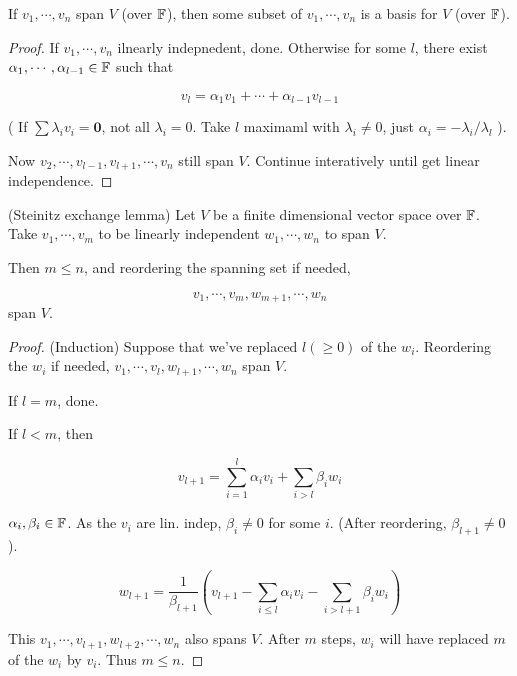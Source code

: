 \documentclass[a4paper]{article}
\begin{document}
\begin{lemma} 
	If $ v_{1},\cdots,v_{n} $ span $ V $ (over $ \mathbb{F} $), then some subset of $ v_{1},\cdots,v_{n} $ is a basis for $ V $ (over $ \mathbb{F} $).	
\end{lemma}

\begin{proof}
		If $ v_{1},\cdots,v_{n} $ ilnearly indepnedent, done.
		Otherwise for some $ l $, there exist $ \alpha_{1},\cdots,\alpha_{l-1} \in \mathbb{F} $ such that
		
		\[ v_{l} = \alpha_{1} v_{1} + \cdots + \alpha_{l-1}v_{l-1} \]
		
		
		( If $ \sum \lambda_{i} v_{i} = \mathbf{0}$, not all $ \lambda_{i} = 0 $. Take $ l $ maximaml with $ \lambda_{i} \neq  0$, just $ \alpha_{i} = - \lambda_{i} / \lambda_{l} $ ).
		
		Now $ v_{2}, \cdots, v_{l-1},v_{l+1},\cdots,v_{n} $ still span $ V $. Continue interatively until get linear independence. 
		
\end{proof}

\begin{thm} (Steinitz exchange lemma)
	Let $ V $ be a finite dimensional vector space over $ \mathbb{F} $. Take $ v_{1},\cdots,v_{m} $ to be linearly independent $ w_{1},\cdots,w_{n} $ to span $ V $. 
	
	Then $ m \leq n $, and reordering the spanning set if needed,
	
	\[ v_{1},\cdots, v_{m}, w_{m+1},\cdots,w_{n} \] span $ V $.
	
\end{thm}

\begin{proof} (Induction)
	Suppose that we've replaced $ l (\geq 0)$ of the $ w_{i} $. Reordering the $ w_{i} $ if needed, $ v_{1},\cdots,v_{l},w_{l+1},\cdots,w_{n} $ span $ V $. 
	
	If $ l = m $, done.
	
	If $ l < m $, then
	
	\[ v_{l+1} = \sum_{i=1}^{l} \alpha_{i} v_{i}  + \sum_{i > l} \beta_{i} w_{i} \]
	
	$ \alpha_{i}, \beta_{i} \in \mathbb{F} $. As the $ v_{i} $ are lin. indep, $ \beta_{i} \neq 0 $ for some $ i $. (After reordering, $ \beta_{l+1} \neq 0 $).
	
	\[ w_{l+1} = \frac{1}{\beta_{l+1}} \left( v_{l+1} - \sum_{i \leq l} \alpha_{i} v_{i}  - \sum_{i > l+1} \beta_{i} w_{i} \right)  \]
	
	This $ v_{1},\cdots,v_{l+1},w_{l+2},\cdots,w_{n} $ also spans $ V $. After $ m $ steps, $ w_{i} $ will have replaced $ m $ of the $ w_{i} $ by $ v_{i} $. Thus $ m \leq n $.
\end{proof}
\end{document}
